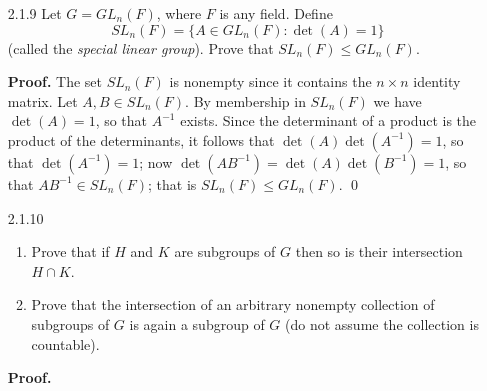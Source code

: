\begin{enumerate}
      \textbf{Proof.} Suppose first that $H \cup K \le G$. Now assume to the
      contrary that neither $H$ nor $K$ is a subset of the other. Thus there
      exist $h \in H$ and $k \in K$ such that $h \notin K$ and $k \notin H$.
      Since $h, k \in H \cup K$ and $H \cup K$ is a group, it follows that
      $hk \in H \cup K$. Assume without loss that $hk \in H$. Then it follows
      that $k = (h^{-1})hk \in H$, a contradiction. Thus we must have that
      either $H \subseteq K$ or $K \subseteq H$. The converse of the proof is 
      trivial. \qed
   \item[2.1.9]   Let $G = GL_n(F)$, where $F$ is any field. Define
                  $$SL_n(F) = \{A \in GL_n(F) : \det(A) = 1\}$$
                  (called the \textit{special linear group}). Prove that
                  $SL_n(F) \le GL_n(F)$.

      \textbf{Proof.} The set $SL_n(F)$ is nonempty since it contains the
      $n \times n$ identity matrix. Let $A, B \in SL_n(F)$. By membership in
      $SL_n(F)$ we have $\det(A) = 1$, so that $A^{-1}$ exists. Since the
      determinant of a product is the product of the determinants, it follows
      that $\det(A)\det(A^{-1}) = 1$, so that $\det(A^{-1}) = 1$; now
      $\det(AB^{-1}) = \det(A)\det(B^{-1}) = 1$, so that $AB^{-1} \in SL_n(F)$; 
      that is $SL_n(F) \le GL_n(F)$. \qed
   \item[2.1.10]  \begin{enumerate}
                     \item Prove that if $H$ and $K$ are subgroups of $G$ then
                           so is their intersection $H \cap K$.
                     \item Prove that the intersection of an arbitrary nonempty
                           collection of subgroups of $G$ is again a subgroup of
                           $G$ (do not assume the collection is countable).
                  \end{enumerate}

      \textbf{Proof.}


\end{enumerate}
